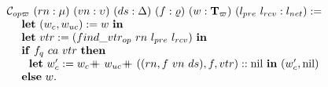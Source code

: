 \begin{figure}
$$\begin{array}{ll}
\opwcons\ (rn: \termnum)\ (vn :\seqnum)\ (ds : \dsvalue)\ (f: \updatefunc)\ (w :\witnesstree)\ (l_{pre}\ l_{rcv}: \networklog) := \\
 \ \ \ \ \mbox{\textbf{let}}\ (w_c, w_{uc}) := w\  \mbox{\textbf{in}} \\ 
\ \ \ \ \mbox{\textbf{let}}\ vtr := (find\_vtr_{op} \ rn \ l_{pre} \ l_{rcv})\  \mbox{\textbf{in}} \\ 
\ \ \ \ \mbox{\textbf{if}} \ f_{q} \ ca \ vtr \ \mbox{\textbf{then}}  \\
\ \ \ \ \ \  \mbox{\textbf{let}}\ w_c' := w_c \doubleplus w_{uc} \doubleplus ((rn, f\ vn \ ds), f, vtr)::\text{nil} \  \mbox{\textbf{in}} \ (w_c',  \text{nil})\\
\ \ \ \ \mbox{\textbf{else}}  \ w.\\
\end{array}
$$
%

\end{figure}
